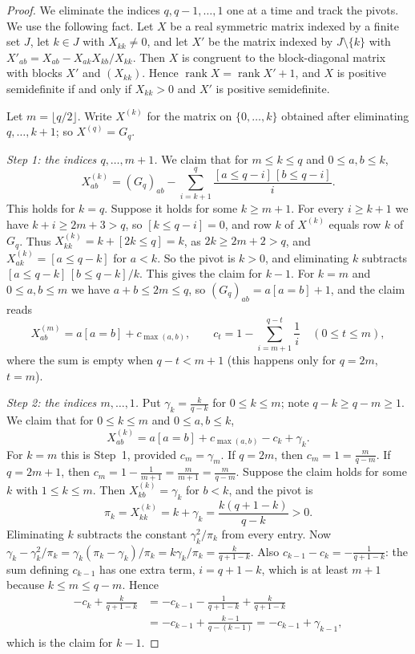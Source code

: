 \documentclass[11pt]{amsart}
\theoremstyle{plain}
\theoremstyle{definition}
\theoremstyle{remark}
\numberwithin{equation}{section}
\newcommand{\iv}[1]{[#1]}              %
\DeclareMathOperator{\rank}{rank}
\begin{document}
\begin{proof}
We eliminate the indices \(q,q-1,\dots,1\) one at a time and track the pivots. We use
the following fact. Let \(X\) be a real symmetric matrix indexed by a finite set \(J\),
let \(k\in J\) with \(X_{kk}\ne0\), and let \(X'\) be the matrix indexed by
\(J\setminus\{k\}\) with \(X'_{ab}=X_{ab}-X_{ak}X_{kb}/X_{kk}\). Then \(X\) is congruent
to the block-diagonal matrix with blocks \(X'\) and \((X_{kk})\). Hence
\(\rank X=\rank X'+1\), and \(X\) is positive semidefinite if and only if \(X_{kk}>0\)
and \(X'\) is positive semidefinite.

Let \(m=\lfloor q/2\rfloor\). Write \(X^{(k)}\) for the matrix on \(\{0,\dots,k\}\)
obtained after eliminating \(q,\dots,k+1\); so \(X^{(q)}=G_q\).

\emph{Step 1: the indices \(q,\dots,m+1\).} We claim that for \(m\le k\le q\) and
\(0\le a,b\le k\),
\[
X^{(k)}_{ab}=(G_q)_{ab}-\sum_{i=k+1}^{q}\frac{\iv{a\le q-i}\,\iv{b\le q-i}}{i}.
\]
This holds for \(k=q\). Suppose it holds for some \(k\ge m+1\). For every \(i\ge k+1\)
we have \(k+i\ge2m+3>q\), so \(\iv{k\le q-i}=0\), and row \(k\) of \(X^{(k)}\) equals
row \(k\) of \(G_q\). Thus \(X^{(k)}_{kk}=k+\iv{2k\le q}=k\), as \(2k\ge2m+2>q\), and
\(X^{(k)}_{ak}=\iv{a\le q-k}\) for \(a<k\). So the pivot is \(k>0\), and eliminating
\(k\) subtracts \(\iv{a\le q-k}\,\iv{b\le q-k}/k\). This gives the claim for \(k-1\). For
\(k=m\) and \(0\le a,b\le m\) we have \(a+b\le2m\le q\), so
\((G_q)_{ab}=a\iv{a=b}+1\), and the claim reads
\[
X^{(m)}_{ab}=a\iv{a=b}+c_{\max(a,b)},\qquad
c_t=1-\sum_{i=m+1}^{q-t}\frac1i\quad(0\le t\le m),
\]
where the sum is empty when \(q-t<m+1\) (this happens only for \(q=2m\), \(t=m\)).

\emph{Step 2: the indices \(m,\dots,1\).} Put \(\gamma_k=\frac{k}{q-k}\) for
\(0\le k\le m\); note \(q-k\ge q-m\ge1\). We claim that for \(0\le k\le m\) and
\(0\le a,b\le k\),
\[
X^{(k)}_{ab}=a\iv{a=b}+c_{\max(a,b)}-c_k+\gamma_k.
\]
For \(k=m\) this is Step~1, provided \(c_m=\gamma_m\). If \(q=2m\), then
\(c_m=1=\frac{m}{q-m}\). If \(q=2m+1\), then \(c_m=1-\frac1{m+1}=\frac m{m+1}
=\frac{m}{q-m}\). Suppose the claim holds for some \(k\) with \(1\le k\le m\). Then
\(X^{(k)}_{kb}=\gamma_k\) for \(b<k\), and the pivot is
\[
\pi_k=X^{(k)}_{kk}=k+\gamma_k=\frac{k(q+1-k)}{q-k}>0.
\]
Eliminating \(k\) subtracts the constant \(\gamma_k^2/\pi_k\) from every entry. Now
\(\gamma_k-\gamma_k^2/\pi_k=\gamma_k(\pi_k-\gamma_k)/\pi_k=k\gamma_k/\pi_k
=\frac{k}{q+1-k}\). Also \(c_{k-1}-c_k=-\frac1{q+1-k}\): the sum defining \(c_{k-1}\)
has one extra term, \(i=q+1-k\), which is at least \(m+1\) because \(k\le m\le q-m\).
Hence
\begin{align*}
-c_k+\frac{k}{q+1-k}&=-c_{k-1}-\frac{1}{q+1-k}+\frac{k}{q+1-k}\\
&=-c_{k-1}+\frac{k-1}{q-(k-1)}=-c_{k-1}+\gamma_{k-1},
\end{align*}
which is the claim for \(k-1\).


\end{proof}
\end{document}
